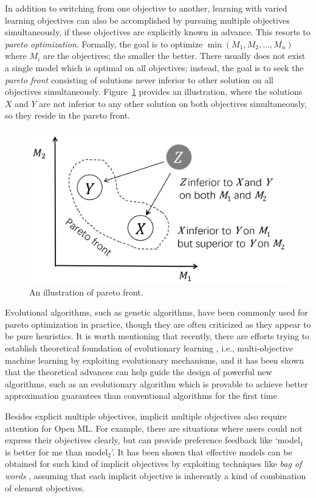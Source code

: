 \documentclass[review,11pt]{ReportTemplate}
\begin{document}
In addition to switching from one objective to another, learning with varied learning objectives can also be accomplished by pursuing multiple objectives simultaneously, if these objectives are explicitly known in advance. This resorts to \textit{pareto optimization}. Formally, the goal is to optimize $\min (M_1, M_2, \dots, M_n)$ where $M_i$ are the objectives; the smaller the better. There usually does not exist a single model which is optimal on all objectives; instead, the goal is to seek the \textit{pareto front} consisting of solutions never inferior to other solution on all objectives simultaneously. Figure~\ref{fig:fig5} provides an illustration, where the solutions $X$ and $Y$ are not inferior to any other solution on both objectives simultaneously, so they reside in the pareto front.

\begin{figure}[!ht]
\begin{center}
  \includegraphics[width=0.55\linewidth]{fig5}
  \caption{An illustration of pareto front.}\label{fig:fig5}
\end{center}
\end{figure}

Evolutional algorithms, such as genetic algorithms, have been commonly used for pareto optimization in practice, though they are often criticized as they appear to be pure heuristics. It is worth mentioning that recently, there are efforts trying to establish theoretical foundation of evolutionary learning \cite{Zhou:Yu:Qian2019}, i.e., multi-objective machine learning by exploiting evolutionary mechanisms, and it has been shown that the theoretical advances can help guide the design of powerful new algorithms, such as an evolutionary algorithm which is provable to achieve better approximation guarantees than conventional algorithms for the first time.

Besides explicit multiple objectives, implicit multiple objectives also require attention for Open ML. For example, there are situations where users could not express their objectives clearly, but can provide preference feedback like `model$_1$ is better for me than model$_2$'. It has been shown \cite{Ding:Zhou2018} that effective models can be obtained for such kind of implicit objectives by exploiting techniques like \textit{bag of words} \cite{Zhang:Jin:Zhou2010}, assuming that each implicit objective is inherently a kind of combination of element objectives.
\end{document}
